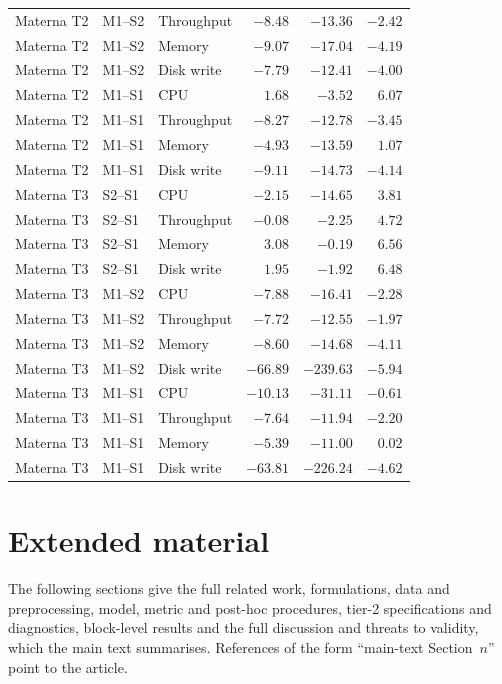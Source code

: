 \documentclass[a4paper,11pt]{article}
\begin{document}
\begin{longtable}{@{}lllrrr@{}}
  Materna T2 & M1--S2 & Throughput & $-8.48$ & $-13.36$ & $-2.42$ \\
  Materna T2 & M1--S2 & Memory & $-9.07$ & $-17.04$ & $-4.19$ \\
  Materna T2 & M1--S2 & Disk write & $-7.79$ & $-12.41$ & $-4.00$ \\
  Materna T2 & M1--S1 & CPU & $ 1.68$ & $-3.52$ & $ 6.07$ \\
  Materna T2 & M1--S1 & Throughput & $-8.27$ & $-12.78$ & $-3.45$ \\
  Materna T2 & M1--S1 & Memory & $-4.93$ & $-13.59$ & $ 1.07$ \\
  Materna T2 & M1--S1 & Disk write & $-9.11$ & $-14.73$ & $-4.14$ \\
  Materna T3 & S2--S1 & CPU & $-2.15$ & $-14.65$ & $ 3.81$ \\
  Materna T3 & S2--S1 & Throughput & $-0.08$ & $-2.25$ & $ 4.72$ \\
  Materna T3 & S2--S1 & Memory & $ 3.08$ & $-0.19$ & $ 6.56$ \\
  Materna T3 & S2--S1 & Disk write & $ 1.95$ & $-1.92$ & $ 6.48$ \\
  Materna T3 & M1--S2 & CPU & $-7.88$ & $-16.41$ & $-2.28$ \\
  Materna T3 & M1--S2 & Throughput & $-7.72$ & $-12.55$ & $-1.97$ \\
  Materna T3 & M1--S2 & Memory & $-8.60$ & $-14.68$ & $-4.11$ \\
  Materna T3 & M1--S2 & Disk write & $-66.89$ & $-239.63$ & $-5.94$ \\
  Materna T3 & M1--S1 & CPU & $-10.13$ & $-31.11$ & $-0.61$ \\
  Materna T3 & M1--S1 & Throughput & $-7.64$ & $-11.94$ & $-2.20$ \\
  Materna T3 & M1--S1 & Memory & $-5.39$ & $-11.00$ & $ 0.02$ \\
  Materna T3 & M1--S1 & Disk write & $-63.81$ & $-226.24$ & $-4.62$ \\
\end{longtable}
\normalsize

\clearpage
\section*{Extended material}
The following sections give the full related work, formulations, data and preprocessing, model, metric and post-hoc procedures, tier-2 specifications and diagnostics, block-level results and the full discussion and threats to validity, which the main text summarises. References of the form ``main-text Section~$n$'' point to the article.
\clearpage
\end{document}
